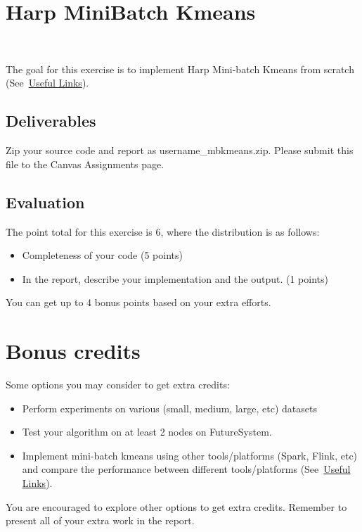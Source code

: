 \section{Harp Mini\-Batch Kmeans}

\FILENAME\


The goal for this exercise is to implement Harp Mini-batch Kmeans
from scratch (See~\hyperlink{link_exercise8}{Useful Links}). 

\subsection{Deliverables}
Zip your source code and report as username\_mbkmeans.zip. Please submit this
file to the Canvas Assignments page.

\subsection{Evaluation}

The point total for this exercise is 6, where the distribution is as
follows:

\begin{itemize}
\item Completeness of your code (5 points)
\item In the report, describe your implementation and the output. (1 points)
\end{itemize}

You can get up to 4 bonus points based on your extra efforts.

\section{Bonus credits}

Some options you may consider to get extra credits: 

\begin{itemize}
\item Perform experiments on various (small, medium, large, etc)
  datasets
\item Test your algorithm on at least 2 nodes on FutureSystem.
\item Implement mini-batch kmeans using other tools/platforms (Spark,
  Flink, etc) and compare the performance between different
  tools/platforms (See~\hyperlink{link_exercise8}{Useful Links}).
\end{itemize}

You are encouraged to explore other options to get extra
credits. Remember to present all of your extra work in the report.
 
